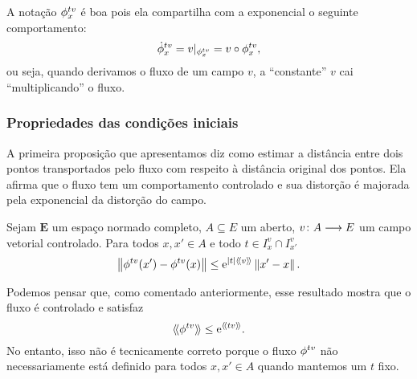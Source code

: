 A notação $\phi^{tv}_x$ é boa pois ela compartilha com a exponencial o seguinte comportamento:
	\begin{equation*}
	\dot {\phi}^{tv}_{x} = v|_{\phi^{tv}_{x}} = v \circ \phi^{tv}_{x},
	\end{equation*}
ou seja, quando derivamos o fluxo de um campo $v$, a ``constante'' $v$ cai ``multiplicando'' o fluxo.

\subsubsection{Propriedades das condições iniciais}

A primeira proposição que apresentamos diz como estimar a distância entre dois pontos transportados pelo fluxo com respeito à distância original dos pontos. Ela afirma que o fluxo tem um comportamento controlado e sua distorção é majorada pela exponencial da distorção do campo.

\begin{proposition}
Sejam $\bm E$ um espaço normado completo, $A \subseteq E$ um aberto, $v\colon \allowbreak A \longrightarrow E$ um campo vetorial controlado. Para todos $x, x' \in A$ e todo $t \in I^v_{x} \cap I^v_{x'}$
	\begin{equation*}
	\left\Vert{\phi^{tv}(x') - \phi^{tv}(x)}\right\Vert \leq \mathrm{e}^{\left\vert{t}\right\vert\langle\!\langle{v}\rangle\!\rangle}\left\Vert{x'-x}\right\Vert.
	\end{equation*}
\end{proposition}

Podemos pensar que, como comentado anteriormente, esse resultado mostra que o fluxo é controlado e satisfaz
	\begin{equation*}
	\langle\!\langle{\phi^{tv}}\rangle\!\rangle \leq \mathrm{e}^{\langle\!\langle{tv}\rangle\!\rangle}.
	\end{equation*}
No entanto, isso não é tecnicamente correto porque o fluxo $\phi^{tv}$ não necessariamente está definido para todos $x, x' \in A$ quando mantemos um $t$ fixo.

